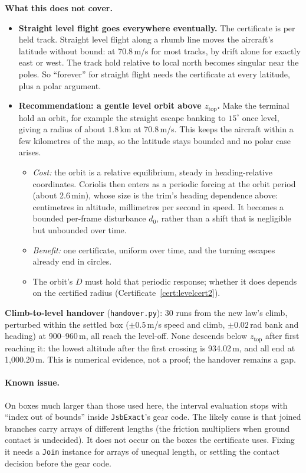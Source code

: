 \documentclass[11pt]{article}
\newcommand{\zTop}{z_{\mathrm{top}}}
\begin{document}
\textbf{What this does not cover.}
\begin{itemize}
\item \textbf{Straight level flight goes everywhere eventually.} The certificate is per held track. Straight level flight along a rhumb line moves the aircraft's latitude without bound: at 70.8\,m/s for most tracks, by drift alone for exactly east or west. The track hold relative to local north becomes singular near the poles. So ``forever'' for straight flight needs the certificate at every latitude, plus a polar argument.
\item \textbf{Recommendation: a gentle level orbit above $\zTop$.} Make the terminal hold an orbit, for example the straight escape banking to $15^\circ$ once level, giving a radius of about $1.8$\,km at 70.8\,m/s. This keeps the aircraft within a few kilometres of the map, so the latitude stays bounded and no polar case arises.
  \begin{itemize}
  \item \emph{Cost:} the orbit is a relative equilibrium, steady in heading-relative coordinates. Coriolis then enters as a periodic forcing at the orbit period (about 2.6\,min), whose size is the trim's heading dependence above: centimetres in altitude, millimetres per second in speed. It becomes a bounded per-frame disturbance $d_0$, rather than a shift that is negligible but unbounded over time.
  \item \emph{Benefit:} one certificate, uniform over time, and the turning escapes already end in circles.
  \item The orbit's $D$ must hold that periodic response; whether it does depends on the certified radius (Certificate~\ref{cert:levelcert2}).
  \end{itemize}
\end{itemize}

\textbf{Climb-to-level handover} (\texttt{handover.py}): 30 runs from the new law's climb, perturbed within the settled box ($\pm0.5$\,m/s speed and climb, $\pm0.02$\,rad bank and heading) at 900--960\,m, all reach the level-off. None descends below $\zTop$ after first reaching it: the lowest altitude after the first crossing is 934.02\,m, and all end at 1{,}000.20\,m. This is numerical evidence, not a proof; the handover remains a gap.

\paragraph{Known issue.} On boxes much larger than those used here, the interval evaluation stops with ``index out of bounds'' inside \texttt{JsbExact}'s gear code. The likely cause is that joined branches carry arrays of different lengths (the friction multipliers when ground contact is undecided). It does not occur on the boxes the certificate uses. Fixing it needs a \texttt{Join} instance for arrays of unequal length, or settling the contact decision before the gear code.
\end{document}
